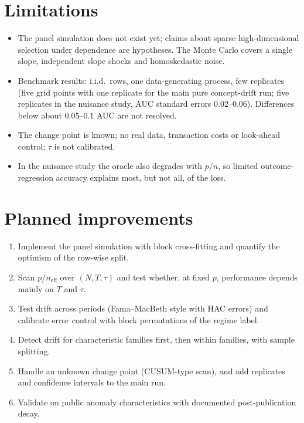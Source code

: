 \documentclass[11pt]{article}
\begin{document}
\section{Limitations}
\begin{itemize}
\item The panel simulation does not exist yet; claims about sparse high-dimensional selection under dependence are hypotheses. The Monte Carlo covers a single slope, independent slope shocks and homoskedastic noise.
\item Benchmark results: i.i.d.\ rows, one data-generating process, few replicates (five grid points with one replicate for the main pure concept-drift run; five replicates in the nuisance study, AUC standard errors $0.02$--$0.06$). Differences below about $0.05$--$0.1$ AUC are not resolved.
\item The change point is known; no real data, transaction costs or look-ahead control; $\tau$ is not calibrated.
\item In the nuisance study the oracle also degrades with $p/n$, so limited outcome-regression accuracy explains most, but not all, of the loss.
\end{itemize}

\section{Planned improvements}
\begin{enumerate}
\item Implement the panel simulation with block cross-fitting and quantify the optimism of the row-wise split.
\item Scan $p/n_{\text{eff}}$ over $(N,T,\tau)$ and test whether, at fixed $p$, performance depends mainly on $T$ and $\tau$.
\item Test drift across periods (Fama--MacBeth style with HAC errors) and calibrate error control with block permutations of the regime label.
\item Detect drift for characteristic families first, then within families, with sample splitting.
\item Handle an unknown change point (CUSUM-type scan), and add replicates and confidence intervals to the main run.
\item Validate on public anomaly characteristics with documented post-publication decay.
\end{enumerate}
\end{document}
